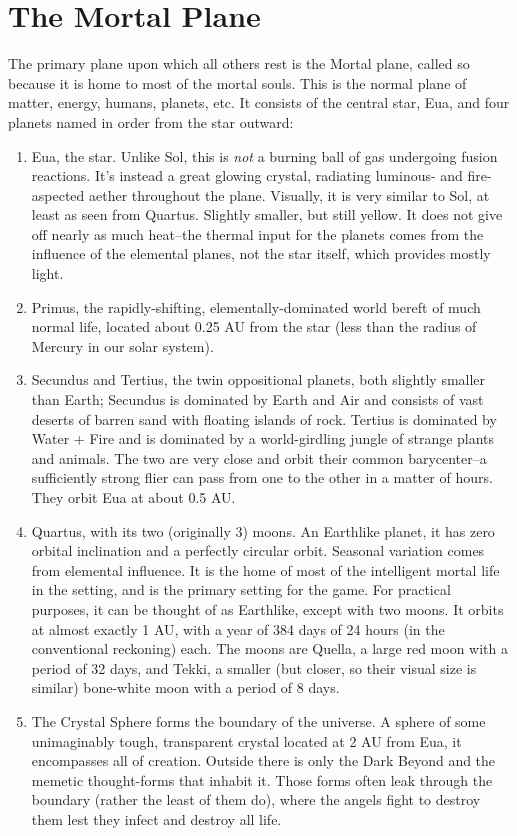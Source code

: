 \section{The Mortal Plane}
The primary plane upon which all others rest is the Mortal plane, called so because it is home to most of the mortal souls. This is the normal plane of matter, energy, humans, planets, etc. It consists of the central star, Eua, and four planets named in order from the star outward:
\begin{enumerate}
	\item Eua, the star. Unlike Sol, this is \textit{not} a burning ball of gas undergoing fusion reactions. It's instead a great glowing crystal, radiating luminous- and fire-aspected aether throughout the plane. Visually, it is very similar to Sol, at least as seen from Quartus. Slightly smaller, but still yellow. It does not give off nearly as much heat--the thermal input for the planets comes from the influence of the elemental planes, not the star itself, which provides mostly light.
	\item Primus, the rapidly-shifting, elementally-dominated world bereft of much normal life, located about 0.25 AU from the star (less than the radius of Mercury in our solar system).
	\item Secundus and Tertius, the twin oppositional planets, both slightly smaller than Earth; Secundus is dominated by Earth and Air and consists of vast deserts of barren sand with floating islands of rock. Tertius is dominated by Water + Fire and is dominated by a world-girdling jungle of strange plants and animals. The two are very close and orbit their common barycenter--a sufficiently strong flier can pass from one to the other in a matter of hours. They orbit Eua at about 0.5 AU.
	\item Quartus, with its two (originally 3) moons. An Earthlike planet, it has zero orbital inclination and a perfectly circular orbit. Seasonal variation comes from elemental influence. It is the home of most of the intelligent mortal life in the setting, and is the primary setting for the game. For practical purposes, it can be thought of as Earthlike, except with two moons. It orbits at almost exactly 1 AU, with a year of 384 days of 24 hours (in the conventional reckoning) each. The moons are Quella, a large red moon with a period of 32 days, and Tekki, a smaller (but closer, so their visual size is similar) bone-white moon with a period of 8 days.
	\item The Crystal Sphere forms the boundary of the universe. A sphere of some unimaginably tough, transparent crystal located at 2 AU from Eua, it encompasses all of creation. Outside there is only the Dark Beyond and the memetic thought-forms that inhabit it. Those forms often leak through the boundary (rather the least of them do), where the angels fight to destroy them lest they infect and destroy all life.
\end{enumerate}

